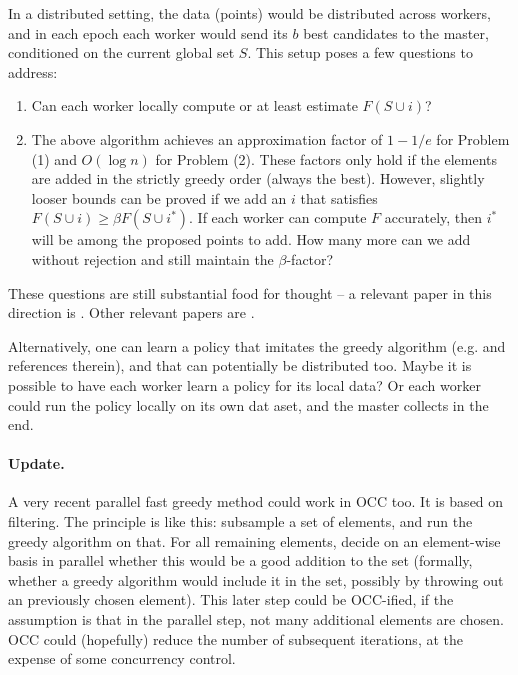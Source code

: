 \documentclass{article}
\newcommand{\union}{\cup}
\begin{document}
In a distributed setting, the data (points) would be distributed across workers, and in each epoch each worker would send its $b$ best candidates to the master, conditioned on the current global set $S$. 
This setup poses a few questions to address:
\begin{enumerate}\setlength{\itemsep}{0pt}
\item Can each worker locally compute or at least estimate $F(S \union i)$?
\item The above algorithm achieves an approximation factor of $1-1/e$ for Problem (1) and $O(\log n)$ for Problem (2). These factors only hold if the elements are added in the strictly greedy order (always the best). However, slightly looser bounds can be proved if we add an $i$ that satisfies $F(S \union i) \geq \beta F(S \union i^*)$. If each worker can compute $F$ accurately, then $i^*$ will be among the proposed points to add. How many more can we add without rejection and still maintain the $\beta$-factor?
\end{enumerate}
These questions are still substantial food for thought -- a relevant paper in this direction is \cite{chen13}. Other relevant papers are \citep{gomes10,golovin10}.

Alternatively, one can learn a policy that imitates the greedy algorithm (e.g. \cite{ross13} and references therein), and that can potentially be distributed too. Maybe it is  possible to have each worker learn a policy for its local data? Or each worker could run the policy locally on its own dat aset, and the master collects in the end.

\paragraph{Update.} A very recent parallel fast greedy method \cite{kumar13} could work in OCC too. It is based on filtering. The principle is like this: subsample a set of elements, and run the greedy algorithm on that. For all remaining elements, decide on an element-wise basis in parallel whether this would be a good addition to the set (formally, whether a greedy algorithm would include it in the set, possibly by throwing out an previously chosen element). This later step could be OCC-ified, if the assumption is that in the parallel step, not many additional elements are chosen. OCC could (hopefully) reduce the number of subsequent iterations, at the expense of some concurrency control.
\end{document}
